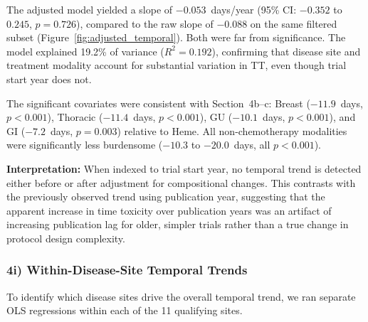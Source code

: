 \documentclass[11pt,a4paper]{article}
\begin{document}
The adjusted model yielded a slope of $-0.053$~days/year (95\% CI: $-0.352$ to $0.245$, $p=0.726$), compared to the raw slope of $-0.088$ on the same filtered subset (Figure~\ref{fig:adjusted_temporal}). Both were far from significance. The model explained 19.2\% of variance ($R^2=0.192$), confirming that disease site and treatment modality account for substantial variation in TT, even though trial start year does not.

The significant covariates were consistent with Section~4b--c: Breast ($-11.9$~days, $p<0.001$), Thoracic ($-11.4$~days, $p<0.001$), GU ($-10.1$~days, $p<0.001$), and GI ($-7.2$~days, $p=0.003$) relative to Heme. All non-chemotherapy modalities were significantly less burdensome ($-10.3$ to $-20.0$~days, all $p<0.001$).

\textbf{Interpretation:} When indexed to trial start year, no temporal trend is detected either before or after adjustment for compositional changes. This contrasts with the previously observed trend using publication year, suggesting that the apparent increase in time toxicity over publication years was an artifact of increasing publication lag for older, simpler trials rather than a true change in protocol design complexity.

\subsubsection{4i) Within-Disease-Site Temporal Trends}

To identify which disease sites drive the overall temporal trend, we ran separate OLS regressions within each of the 11 qualifying sites.
\end{document}
